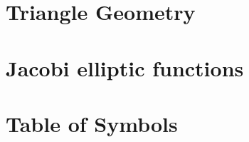 \chapter{Triangle Geometry}
\label{app:app-triangle}


\chapter{Jacobi elliptic functions}
\label{app:jacobi-functions}
  

%

%  




\chapter{Table of Symbols}
\label{app:app-symbols}


